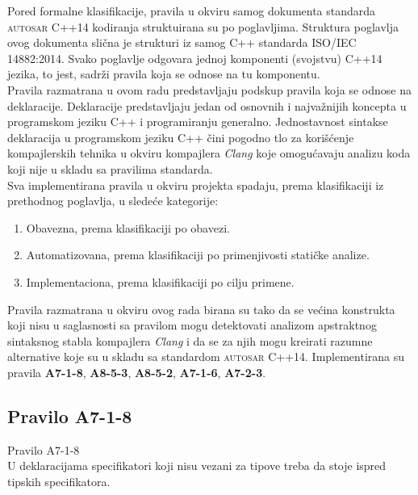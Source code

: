 \documentclass[12pt,oneside]{memoir}
\begin{document}
Pored formalne klasifikacije, pravila u okviru samog dokumenta standarda \textsc{autosar} C++14  kodiranja struktuirana su po poglavljima.
Struktura poglavlja ovog dokumenta slična je strukturi iz samog C++ standarda ISO/IEC 14882:2014. Svako poglavlje odgovara jednoj komponenti (svojstvu) C++14 jezika, to jest, sadrži pravila koja se odnose na tu komponentu.
\\
\indent
Pravila razmatrana u ovom radu predstavljaju podskup pravila koja se odnose na deklaracije. Deklaracije predstavljaju jedan
od osnovnih i najvažnijih koncepta u programskom jeziku C++ i programiranju generalno.
Jednostavnost sintakse deklaracija u programskom jeziku C++ čini pogodno tlo za korišćenje kompajlerskih tehnika u okviru kompajlera \textit{Clang} koje omogu\'{c}avaju analizu koda koji nije u skladu sa pravilima standarda.
\\
\indent
Sva implementirana pravila u okviru projekta spadaju, prema klasifikaciji iz prethodnog poglavlja, u sledeće kategorije:
\begin{enumerate}
  \item{Obavezna, prema klasifikaciji po obavezi.}
  \item{Automatizovana, prema klasifikaciji po primenjivosti statičke analize.}
  \item{Implementaciona, prema klasifikaciji po cilju primene.}
\end{enumerate}
Pravila razmatrana u okviru ovog rada birana su tako da se većina konstrukta koji nisu u saglasnosti sa pravilom mogu detektovati analizom apstraktnog sintaksnog stabla kompajlera \textit{Clang} i da se za njih mogu kreirati razumne alternative koje su u skladu sa standardom \textsc{autosar} C++14.
Implementirana su pravila \textbf{A7-1-8}, \textbf{A8-5-3}, \textbf{A8-5-2}, \textbf{A7-1-6}, \textbf{A7-2-3}.

\subsection{Pravilo A7-1-8}
\begin{center}
\begin{tcolorbox}
         Pravilo A7-1-8 \\
         U deklaracijama specifikatori koji nisu vezani za tipove treba da stoje
         ispred tipskih specifikatora.
\end{tcolorbox}
\end{center}
\end{document}
